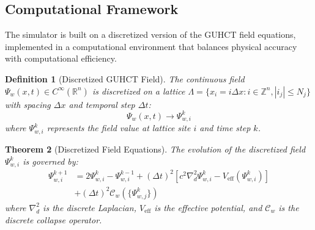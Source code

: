 \documentclass[11pt,a4paper]{article}
\newtheorem{theorem}{Theorem}[section]
\newtheorem{definition}[theorem]{Definition}
\begin{document}
\subsection{Computational Framework}
\label{subsec:computational_framework}

The simulator is built on a discretized version of the GUHCT field equations, implemented in a computational environment that balances physical accuracy with computational efficiency.

\begin{definition}[Discretized GUHCT Field]
\label{def:discretized_field}
The continuous field $\Psi_w(x,t) \in C^\infty(\mathbb{R}^n)$ is discretized on a lattice $\Lambda = \{x_i = i\Delta x : i \in \mathbb{Z}^n, |i_j| \leq N_j\}$ with spacing $\Delta x$ and temporal step $\Delta t$:
\begin{equation}
\Psi_w(x,t) \to \Psi_{w,i}^k
\end{equation}
where $\Psi_{w,i}^k$ represents the field value at lattice site $i$ and time step $k$.
\end{definition}

\begin{theorem}[Discretized Field Equations]
\label{thm:discretized_equations}
The evolution of the discretized field $\Psi_{w,i}^k$ is governed by:
\begin{equation}
\begin{aligned}
\Psi_{w,i}^{k+1} &= 2\Psi_{w,i}^k - \Psi_{w,i}^{k-1} + (\Delta t)^2 \left[ c^2 \nabla^2_d \Psi_{w,i}^k - V_{\text{eff}}(\Psi_{w,i}^k) \right] \\
&+ (\Delta t)^2 \mathcal{C}_w(\{\Psi_{w,j}^k\})
\end{aligned}
\end{equation}
where $\nabla^2_d$ is the discrete Laplacian, $V_{\text{eff}}$ is the effective potential, and $\mathcal{C}_w$ is the discrete collapse operator.
\end{theorem}
\end{document}
